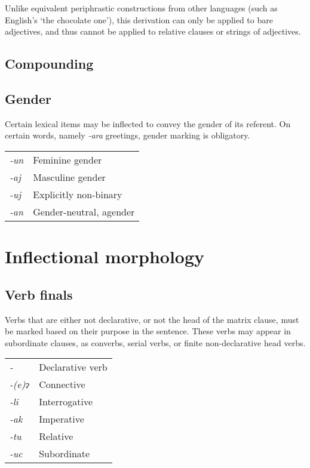 \documentclass[a4paper,10pt,twoside,openright]{memoir}
\newcommand{\lilglot}{ɂ}
\newcommand{\nm}{\symbol{"2205}}
\begin{document}
Unlike equivalent periphrastic constructions from other languages (such as English's `the chocolate one'), this derivation can only be applied to bare adjectives, and thus cannot be applied to relative clauses or strings of adjectives.

\subsection{Compounding}

\subsection{Gender}

Certain lexical items may be inflected to convey the gender of its referent. On certain words, namely \emph{-ara} greetings, gender marking is obligatory.

\begin{table}[ht]
    \centering
    \begin{tabular}{>{\em}ll}
    -un & Feminine gender \\
    -aj & Masculine gender \\
    -uj & Explicitly non-binary \\
    -an & Gender-neutral, agender \\
    \end{tabular}
\end{table}

\section{Inflectional morphology}

\subsection{Verb finals}

Verbs that are either not declarative, or not the head of the matrix clause, must be marked based on their purpose in the sentence. These verbs may appear in subordinate clauses, as converbs, serial verbs, or finite non-declarative head verbs.

\begin{table}[ht]
    \centering
    \begin{tabular}{>{\em}ll}
        -\nm        & Declarative verb \\
        -(e)\lilglot   & Connective \\
        -li         & Interrogative \\
        -ak         & Imperative \\
        -tu         & Relative \\
        -uc         & Subordinate \\
    \end{tabular}
\end{table}
\end{document}
